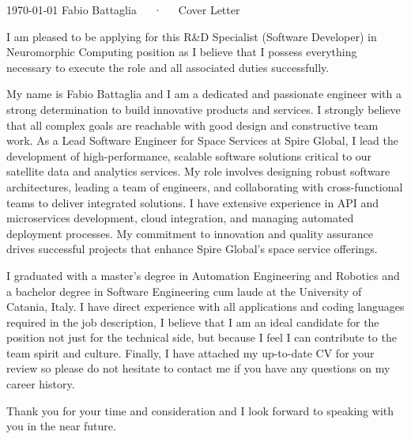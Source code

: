 \documentclass[11pt, a4paper]{awesome-cv}
\begin{document}
\makecvheader[R]

\makecvfooter
  {\today}
  {Fabio Battaglia~~~·~~~Cover Letter}
  {}

\makelettertitle

\begin{cvletter}
I am pleased to be applying for this R&D Specialist (Software Developer) in Neuromorphic Computing position as I believe
that I possess everything necessary to execute the role and all associated duties successfully.

My name is Fabio Battaglia and I am a dedicated and passionate engineer with a strong determination
to build innovative products and services. I strongly believe that all complex goals are reachable
with good design and constructive team work.
As a Lead Software Engineer for Space Services at Spire Global, 
I lead the development of high-performance, scalable software solutions critical to our satellite data and 
analytics services. My role involves designing robust software architectures, leading a team of engineers, 
and collaborating with cross-functional teams to deliver integrated solutions. 
I have extensive experience in API and microservices development, cloud integration, and managing automated deployment processes. 
My commitment to innovation and quality assurance drives successful projects that enhance Spire Global's space service offerings.

I graduated with a master's degree in Automation Engineering and Robotics and a bachelor degree
in Software Engineering cum laude at the University of Catania, Italy.
I have direct experience with all applications and coding languages required in the job description,
I believe that I am an ideal candidate for the position not just for the technical side, but because I feel
I can contribute to the team spirit and culture.
Finally, I have attached my up-to-date CV for your review so please do not hesitate to contact me
if you have any questions on my career history.


Thank you for your time and consideration and I look forward to speaking with you in the near future.

\end{cvletter}


\makeletterclosing
\end{document}
